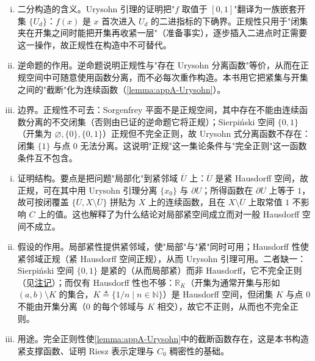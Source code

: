 \documentclass[../main.tex]{subfiles}
\begin{document}
\begin{remark}\label{remark:appA-Urysohn引理}
\begin{enumerate}[(i)]
\item 二分构造的含义。Urysohn 引理的证明把"$f$ 取值于 $[0,1]$"翻译为一族嵌套开集 $\{U_d\}$：$f(x)$ 是 $x$ 首次进入 $U_d$ 的二进指标的下确界。正规性只用于"闭集夹在开集之间时能把开集再收紧一层"（准备事实），逐步插入二进点时正需要这一操作，故正规性在构造中不可替代。
\item 逆命题的作用。逆命题说明正规性与"存在 Urysohn 分离函数"等价，从而在正规空间中可随意使用函数分离，而不必每次重作构造。本书用它把紧集与开集之间的"截断"化为连续函数（\cref{lemma:appA-Urysohn}）。
\item 边界。正规性不可去：Sorgenfrey 平面不是正规空间，其中存在不能由连续函数分离的不交闭集（否则由已证的逆命题它将正规）；Sierpiński 空间 $\{0,1\}$（开集为 $\varnothing,\{0\},\{0,1\}$）正规但不完全正则，故 Urysohn 式分离函数不存在：闭集 $\{1\}$ 与点 $0$ 无法分离。这说明"正规"这一集论条件与"完全正则"这一函数条件互不包含。
\end{enumerate}
\end{remark}

\begin{remark}\label{remark:appA-局部紧完全正则}
\begin{enumerate}[(i)]
\item 证明结构。要点是把问题"局部化"到紧邻域 $\overline U$ 上：$\overline U$ 是紧 Hausdorff 空间，故正规，可在其中用 Urysohn 引理分离 $\{x_0\}$ 与 $\partial U$；所得函数在 $\partial U$ 上等于 $1$，故可按闭覆盖 $\{\overline U,X\setminus\overline U\}$ 拼贴为 $X$ 上的连续函数，且在 $X\setminus\overline U$ 上取常值 $1$ 不影响 $C$ 上的值。这也解释了为什么结论对局部紧空间成立而对一般 Hausdorff 空间不成立。
\item 假设的作用。局部紧性提供紧邻域，使"局部"与"紧"同时可用；Hausdorff 性使紧邻域正规（紧 Hausdorff 空间正规），从而 Urysohn 引理可用。二者缺一：Sierpiński 空间 $\{0,1\}$ 是紧的（从而局部紧）而非 Hausdorff，它不完全正则（见\hyperref[remark:appA-完全正则正规]{注记}）；而仅有 Hausdorff 性也不够：$\mathbb{R}_K$（开集为通常开集与形如 $(a,b)\setminus K$ 的集合，$K\triangleq\{1/n\mid n\in\mathbb{N}\}$）是 Hausdorff 空间，但闭集 $K$ 与点 $0$ 不能由开集分离（$0$ 的每个邻域与 $K$ 相交），故它不正则，从而也不完全正则。
\item 用途。完全正则性使\cref{lemma:appA-Urysohn}中的截断函数存在，这是本书构造紧支撑函数、证明 Riesz 表示定理与 $C_0$ 稠密性的基础。
\end{enumerate}
\end{remark}
\end{document}

